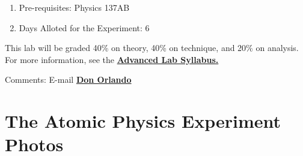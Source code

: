 \documentclass{../lab}
\begin{document}
\begin{enumerate}
    \item Pre-requisites: Physics 137AB

    \item Days Alloted for the Experiment: 6

\end{enumerate}

This lab will be graded 40\% on theory, 40\% on technique, and 20\% on analysis. For more information, see the \href{\AdvancedLabSyllabus}{\textbf{Advanced Lab Syllabus.}}

Comments: E-mail \href{\MailDonOrlando}{\textbf{Don Orlando}}

\section{The Atomic Physics Experiment Photos}
\end{document}
